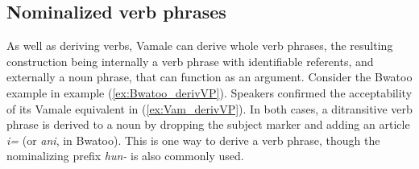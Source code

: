 %

\subsection{Nominalized verb phrases}
\label{sec:NmlzVP}

As well as deriving verbs, Vamale can derive whole verb phrases, the resulting construction being internally a verb phrase with identifiable referents, and externally a noun phrase, that can function as an argument. Consider the Bwatoo example in example (\ref{ex:Bwatoo_derivVP}). Speakers confirmed the acceptability of its Vamale equivalent in (\ref{ex:Vam_derivVP}). In both cases, a ditransitive verb phrase is derived to a noun by dropping the subject marker and adding an article \textit{i=} (or \textit{ani}, in Bwatoo). This is one way to derive a verb phrase, though the nominalizing prefix \textit{hun-} is also commonly used.

